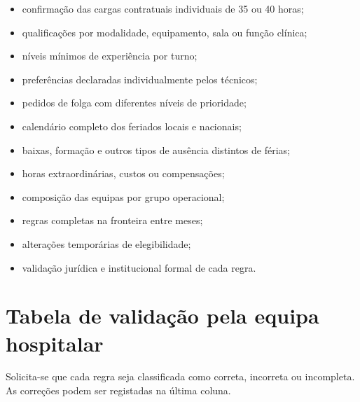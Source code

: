\documentclass[11pt,a4paper]{article}
\begin{document}
\begin{itemize}
    \item confirmação das cargas contratuais individuais de 35 ou 40 horas;
    \item qualificações por modalidade, equipamento, sala ou função clínica;
    \item níveis mínimos de experiência por turno;
    \item preferências declaradas individualmente pelos técnicos;
    \item pedidos de folga com diferentes níveis de prioridade;
    \item calendário completo dos feriados locais e nacionais;
    \item baixas, formação e outros tipos de ausência distintos de férias;
    \item horas extraordinárias, custos ou compensações;
    \item composição das equipas por grupo operacional;
    \item regras completas na fronteira entre meses;
    \item alterações temporárias de elegibilidade;
    \item validação jurídica e institucional formal de cada regra.
\end{itemize}

\section{Tabela de validação pela equipa hospitalar}

Solicita-se que cada regra seja classificada como correta, incorreta ou
incompleta. As correções podem ser registadas na última coluna.
\end{document}
